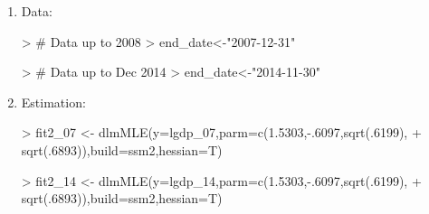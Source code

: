 \documentclass[a4paper]{book}
\begin{document}
\begin{enumerate}
\item Data:
\begin{Schunk}
\begin{Sinput}
> # Data up to 2008
> end_date<-"2007-12-31"
\end{Sinput}
\end{Schunk}
\begin{Schunk}
\begin{Sinput}
> # Data up to Dec 2014
> end_date<-"2014-11-30"
\end{Sinput}
\end{Schunk}
\item Estimation:
\begin{Schunk}
\begin{Sinput}
> fit2_07 <- dlmMLE(y=lgdp_07,parm=c(1.5303,-.6097,sqrt(.6199),
+                             sqrt(.6893)),build=ssm2,hessian=T)
\end{Sinput}
\end{Schunk}
\begin{Schunk}
\begin{Sinput}
> fit2_14 <- dlmMLE(y=lgdp_14,parm=c(1.5303,-.6097,sqrt(.6199),
+                             sqrt(.6893)),build=ssm2,hessian=T)
\end{Sinput}
\end{Schunk}


\end{enumerate}
\end{document}
